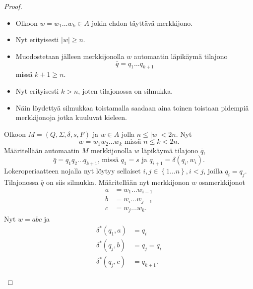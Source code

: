 \documentclass[a4paper,11pt,draft]{article}
\newcommand{\set}[1]{{\left\{ #1 \right\}}}
\begin{document}
\begin{enumerate}
\begin{enumerate}
\begin{proof}
\begin{description}
          \begin{itemize}
            \item Olkoon $w = w_1 \ldots w_k \in A$ jokin ehdon
              täyttävä merkkijono.
            \item Nyt erityisesti $|w| \ge n$.
            \item Muodostetaan jälleen merkkijonolla $w$ automaatin
              läpikäymä tilajono
              \begin{equation*}
                \bar{q} = q_1 \ldots q_{k+1}
              \end{equation*}
              missä
              $k+1 \ge n$.
            \item Nyt erityisesti $k > n$, joten tilajonossa on
              silmukka.
            \item Näin löydettyä silmukkaa toistamalla saadaan aina
              toinen toistaan pidempiä merkkijonoja jotka kuuluvat kieleen.
          \end{itemize}
          Olkoon $M = (Q, \Sigma, \delta, s, F)$ ja $w \in A$ jolla $n
          \le |w| < 2n$. Nyt
          \begin{equation*}
            w = w_1w_2 \ldots w_k \textrm{ missä } n \le k < 2n \textrm{.}
          \end{equation*}
          Määritellään automaatin $M$ merkkijonolla $w$ läpikäymä
          tilajono $\bar{q}$,
          \begin{equation*}
            \bar{q} = q_1q_2 \ldots q_{k+1}
            \textrm{, missä } q_1 = s
            \textrm{ ja } q_{i+1} = \delta(q_i, w_i) \textrm{.}
          \end{equation*}
          Lokeroperiaatteen nojalla nyt löytyy sellaiset $i,j \in
          \set{1 \ldots n}, i < j$, joilla $q_i = q_j$. Tilajonossa
          $\bar{q}$ on siis silmukka. Määritellään nyt merkkijonon $w$
          osamerkkijonot
          \begin{align*}
            a & = w_1 \ldots w_{i-1} \\
            b & = w_i \ldots w_{j-1} \\
            c & = w_j \ldots w_k \textrm{.}
          \end{align*}
          Nyt $w = abc$ ja
          \begin{align*}
            \delta^*(q_1,a) & = q_i \\
            \delta^*(q_j,b) & = q_j = q_i \\
            \delta^*(q_j,c) & = q_{k+1} \textrm{.}
          \end{align*}


\end{description}
\end{proof}
\end{enumerate}
\end{enumerate}
\end{document}
